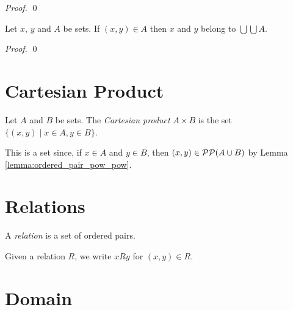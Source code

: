 \begin{proof}
    \pf
    \qed 
\end{proof}

\begin{lemma}
    \label{lemma:ordered_pair_union_union}
    Let $x$, $y$ and $A$ be sets. If $(x,y) \in A$ then $x$ and $y$ belong to $\bigcup \bigcup A$.
\end{lemma}

\begin{proof}
    \pf
    \qed
\end{proof}

\section{Cartesian Product}

\begin{definition}
    Let $A$ and $B$ be sets. The \emph{Cartesian product} $A \times B$ is the set $\{ (x,y) \mid x \in A, y \in B \}$.

    This is a set since, if $x \in A$ and $y \in B$, then $(x,y) \in \mathcal{P} \mathcal{P} (A \cup B)$ by Lemma \ref{lemma:ordered_pair_pow_pow}.
\end{definition}

\section{Relations}

\begin{definition}
    A \emph{relation} is a set of ordered pairs.

    Given a relation $R$, we write $xRy$ for $(x,y) \in R$.
\end{definition}

\section{Domain}

